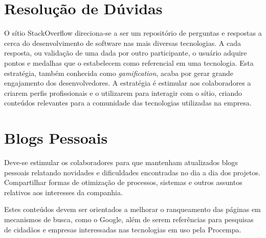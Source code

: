 \section{Resolução de Dúvidas}
O sítio StackOverflow direciona-se a ser um repositório de perguntas e respostas a cerca do desenvolvimento de software nas mais diversas tecnologias. A cada resposta, ou validação de uma dada por outro participante, o usuário adquire pontos e medalhas que o estabelecem como referencial em uma tecnologia. Esta estratégia, também conhecida como \emph{gamification}, acaba por gerar grande engajamento dos desenvolvedores. A estratégia é estimular aos colaboradores a criarem perfis profissionais e o utilizarem para interagir com o sítio, criando conteúdos relevantes para a comunidade das tecnologias utilizadas na empresa.

\section{Blogs Pessoais}
Deve-se estimular os colaboradores para que mantenham atualizados blogs pessoais relatando novidades e dificuldades encontradas no dia a dia dos projetos. Compartilhar formas de otimização de processos, sistemas e outros assuntos relativos aos interesses da companhia.

Estes conteúdos devem ser orientados a melhorar o ranqueamento das páginas em mecanismos de busca, como o Google, além de serem referências para pesquisas de cidadãos e empresas interessadas nas tecnologias em uso pela Procempa.
